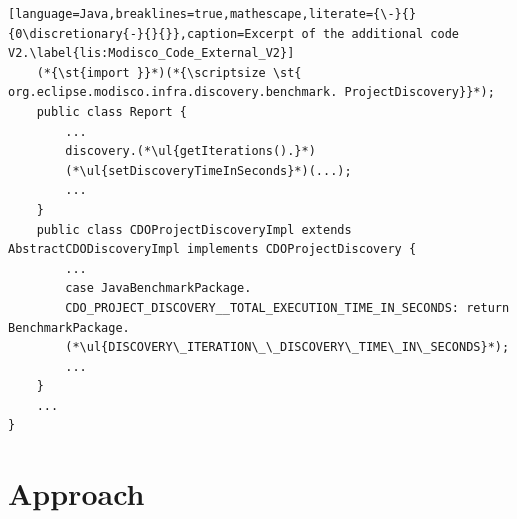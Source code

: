 \begin{lstlisting}[language=Java,breaklines=true,mathescape,literate={\-}{}{0\discretionary{-}{}{}},caption=Excerpt of the additional code V2.\label{lis:Modisco_Code_External_V2}]
	(*{\st{import }}*)(*{\scriptsize \st{ org.eclipse.modisco.infra.discovery.benchmark. ProjectDiscovery}}*);
	public class Report {
		...
		discovery.(*\ul{getIterations().}*) 
		(*\ul{setDiscoveryTimeInSeconds}*)(...);
		...
	}
	public class CDOProjectDiscoveryImpl extends AbstractCDODiscoveryImpl implements CDOProjectDiscovery {
		...
		case JavaBenchmarkPackage.
		CDO_PROJECT_DISCOVERY__TOTAL_EXECUTION_TIME_IN_SECONDS: return BenchmarkPackage.
		(*\ul{DISCOVERY\_ITERATION\_\_DISCOVERY\_TIME\_IN\_SECONDS}*);
		...
	}
	...
}
\end{lstlisting}

\section{Approach}\label{approach}


